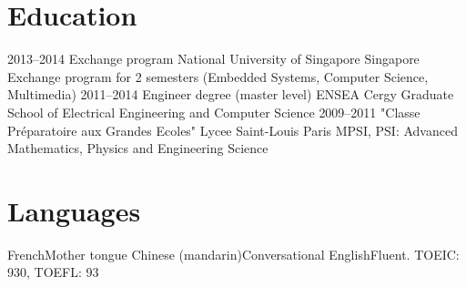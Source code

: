 \documentclass[11pt,a4paper,sans]{moderncv}        %
\begin{document}
\section{Education}
\cventry
  {2013--2014}
  {Exchange program}
  {National University of Singapore}
  {Singapore}
  {}
  {Exchange program for 2 semesters (Embedded Systems, Computer Science, Multimedia)}  %
\cventry
  {2011--2014}
  {Engineer degree (master level)}
  {ENSEA}
  {Cergy}
  {}
  {Graduate School of Electrical Engineering and Computer Science}
\cventry
  {2009--2011}
  {"Classe Préparatoire aux Grandes Ecoles"}
  {Lycee Saint-Louis}
  {Paris}
  {}
  {MPSI, PSI: Advanced Mathematics, Physics and Engineering Science}


\section{Languages}
\cvdoubleitem
  {French}{Mother tongue}
  {Chinese (mandarin)}{Conversational}
\cvdoubleitem
  {English}{Fluent. TOEIC: 930, TOEFL: 93}
  {}{}
\end{document}
